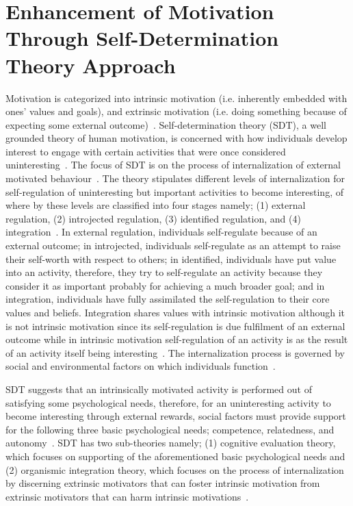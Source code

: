 \section{Enhancement of Motivation Through Self-Determination Theory Approach}
Motivation is categorized into intrinsic motivation (i.e. inherently embedded with ones' values and goals), and extrinsic motivation (i.e. doing something because of expecting some external outcome)~\citep{ryan2000intrinsic}. Self-determination theory (SDT)\citep{deci1985:intrinsic}, a well grounded theory of human motivation, is concerned with how individuals develop interest to engage with certain activities that were once considered uninteresting~\citep{ryan2000intrinsic}. The focus of SDT is on the process of internalization of external motivated behaviour~\citep{ryan2000intrinsic}. The theory stipulates different levels of internalization for self-regulation of uninteresting but important activities to become interesting, of where by these levels are classified into four stages namely; (1) external regulation, (2) introjected regulation, (3) identified regulation, and (4) integration~\citep{ryan2000intrinsic}. In external regulation, individuals self-regulate because of an external outcome; in introjected, individuals self-regulate as an attempt to raise their self-worth with respect to others; in identified, individuals have put value into an activity, therefore, they try to self-regulate an activity because they consider it as important probably for achieving a much broader goal; and in integration, individuals have fully assimilated the self-regulation to their core values and beliefs.  Integration shares values with intrinsic motivation although it is not intrinsic motivation since its self-regulation is due fulfilment of an external outcome while in intrinsic motivation self-regulation of an activity is as the result of an activity itself being interesting~\citep{ryan2000intrinsic}. The internalization process is governed by social and environmental factors on which individuals function~\citep{ryan2000:self,lee2015:relating}.

SDT suggests that an intrinsically motivated activity is performed out of satisfying some psychological needs, therefore, for an uninteresting activity to become interesting through external rewards, social factors must provide support for the following three basic psychological needs; competence, relatedness, and autonomy~\citep{ryan2000intrinsic}. SDT has two sub-theories namely; (1) cognitive evaluation theory, which focuses on supporting of the aforementioned basic psychological needs and (2) organismic integration theory, which focuses on the process of internalization by discerning extrinsic motivators that can foster intrinsic motivation from extrinsic motivators that can harm intrinsic motivations~\citep{ryan2000:self,lee2015:relating}.

